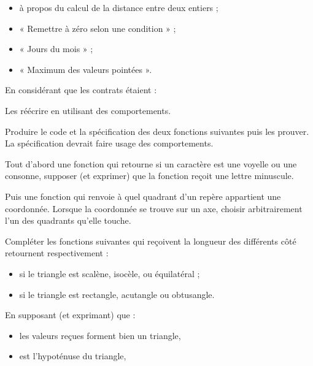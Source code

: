 \begin{itemize}
\item à propos du calcul de la distance entre deux entiers ;
\item « Remettre à zéro selon une condition » ;
\item « Jours du mois » ;
\item « Maximum des valeurs pointées ».
\end{itemize}


En considérant que les contrats étaient :




Les réécrire en utilisant des comportements.




Produire le code et la spécification des deux fonctions suivantes puis
les prouver. La spécification devrait faire usage des comportements.


Tout d'abord une fonction qui retourne si un caractère est une voyelle
ou une consonne, supposer (et exprimer) que la fonction reçoit une
lettre minuscule.




Puis une fonction qui renvoie à quel quadrant d'un repère appartient
une coordonnée. Lorsque la coordonnée se trouve sur un axe, choisir
arbitrairement l'un des quadrants qu'elle touche.






Compléter les fonctions suivantes qui reçoivent la longueur des différents
côté retournent respectivement :


\begin{itemize}
\item si le triangle est scalène, isocèle, ou équilatéral ;
\item si le triangle est rectangle, acutangle ou obtusangle.
\end{itemize}




En supposant (et exprimant) que :


\begin{itemize}
\item les valeurs reçues forment bien un triangle,
\item {} est l'hypoténuse du triangle,
\end{itemize}


